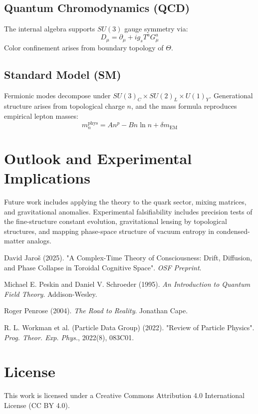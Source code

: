 \documentclass[12pt, a4paper]{article}
\begin{document}
\subsection{Quantum Chromodynamics (QCD)}
The internal algebra supports \( SU(3) \) gauge symmetry via:
\[
D_\mu = \partial_\mu + i g_s T^a G_\mu^a
\]
Color confinement arises from boundary topology of \( \Theta \).

\subsection{Standard Model (SM)}
Fermionic modes decompose under \( SU(3)_C \times SU(2)_L \times U(1)_Y \). Generational structure arises from topological charge \( n \), and the mass formula reproduces empirical lepton masses:
\[
m_n^{\text{phys}} = A n^p - B n \ln n + \delta m_{\text{EM}}
\]

\section{Outlook and Experimental Implications}
Future work includes applying the theory to the quark sector, mixing matrices, and gravitational anomalies. Experimental falsifiability includes precision tests of the fine-structure constant evolution, gravitational lensing by topological structures, and mapping phase-space structure of vacuum entropy in condensed-matter analogs.

\begin{thebibliography}{9}

David Jaroš (2025). "A Complex-Time Theory of Consciousness: Drift, Diffusion, and Phase Collapse in Toroidal Cognitive Space". \textit{OSF Preprint}.

Michael E. Peskin and Daniel V. Schroeder (1995). \textit{An Introduction to Quantum Field Theory}. Addison-Wesley.

Roger Penrose (2004). \textit{The Road to Reality}. Jonathan Cape.

R. L. Workman et al. (Particle Data Group) (2022). "Review of Particle Physics". \textit{Prog. Theor. Exp. Phys.}, 2022(8), 083C01.

\end{thebibliography}


\section*{License}
This work is licensed under a Creative Commons Attribution 4.0 International License (CC BY 4.0).
\end{document}
